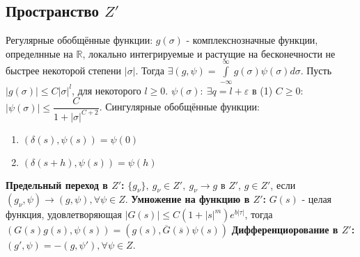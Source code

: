 \documentclass[9pt, a4paper]{article}
\begin{document}
		\subsection{Пространство $Z'$}
			Регулярные обобщённые функции: $g(\sigma)$ - комплекснозначные функции, определнные на $\mathbb{R}$, локально интегрируемые и растущие на бесконечности не быстрее некоторой степени $|\sigma|$. Тогда $\exists (g, \psi) = \int\limits_{-\infty}^{\infty} g(\sigma) \psi(\sigma) d\sigma$. Пусть $|g(\sigma)| \leq C |\sigma|^l$, для некоторого $l \geq 0$. $\psi(\sigma): \ \exists q = l + \varepsilon$ в (1) $C \geq 0$: $|\psi(\sigma)| \leq \dfrac{C}{1 + |\sigma|^{C+2}}$.\newline
			Сингулярные обобщённые функции:
			\begin{enumerate}
				\item $(\delta(s), \psi(s)) = \psi(0)$
				\item $(\delta(s+h), \psi(s)) = \psi(h)$
			\end{enumerate}
			\textbf{Предельный переход в $Z'$:} $\{g_\nu\}, \ g_\nu \in Z', \ g_\nu \to g$ в  $Z'$, $g \in Z'$, если $(g_\nu, \psi) \to (g, \psi), \forall \psi \in Z$.\newline
			\textbf{Умножение на функцию в $Z'$:} $G(s)$ - целая функция, удовлетворяющая $|G(s)| \leq C(1 + |s|^m)e^{b|\tau|}$, тогда $(G(s)g(s), \psi(s)) = (g(s),\overline{G}(\overline{s})\psi(s))$ \newline
			\textbf{Дифференциорование в $Z'$:} $(g', \psi) = -(g, \psi'), \forall \psi \in Z$.
\end{document}
